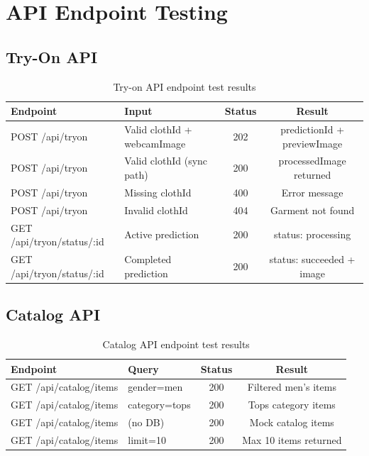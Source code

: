 \section{API Endpoint Testing}
\label{sec:api-tests}

\subsection{Try-On API}

\begin{table}[H]
  \centering
  \caption{Try-on API endpoint test results}
  \label{tab:api-tryon-results}
  \small
  \begin{tabular}{@{}llcc@{}}
    \toprule
    \textbf{Endpoint} & \textbf{Input} & \textbf{Status} & \textbf{Result} \\
    \midrule
    POST /api/tryon & Valid clothId + webcamImage & 202 & predictionId + previewImage \\
    POST /api/tryon & Valid clothId (sync path) & 200 & processedImage returned \\
    POST /api/tryon & Missing clothId & 400 & Error message \\
    POST /api/tryon & Invalid clothId & 404 & Garment not found \\
    GET /api/tryon/status/:id & Active prediction & 200 & status: processing \\
    GET /api/tryon/status/:id & Completed prediction & 200 & status: succeeded + image \\
    \bottomrule
  \end{tabular}
\end{table}

\subsection{Catalog API}

\begin{table}[H]
  \centering
  \caption{Catalog API endpoint test results}
  \label{tab:api-catalog-results}
  \small
  \begin{tabular}{@{}llcc@{}}
    \toprule
    \textbf{Endpoint} & \textbf{Query} & \textbf{Status} & \textbf{Result} \\
    \midrule
    GET /api/catalog/items & gender=men & 200 & Filtered men's items \\
    GET /api/catalog/items & category=tops & 200 & Tops category items \\
    GET /api/catalog/items & (no DB) & 200 & Mock catalog items \\
    GET /api/catalog/items & limit=10 & 200 & Max 10 items returned \\
    \bottomrule
  \end{tabular}
\end{table}

